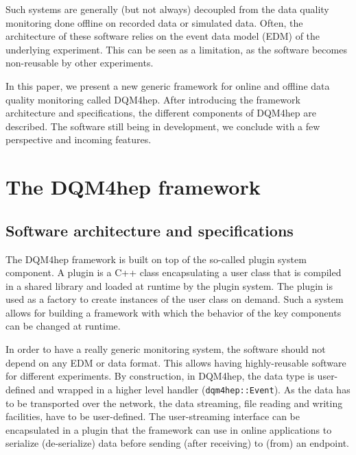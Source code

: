 \documentclass{webofc}
\begin{document}
Such systems are generally (but not always) decoupled from the data quality monitoring done offline on recorded data or simulated data.
Often, the architecture of these software relies on the event data model (EDM) of the underlying experiment. This can be seen as a limitation, as the software becomes non-reusable by other experiments.

In this paper, we present a new generic framework for online and offline data quality monitoring called DQM4hep.
After introducing the framework architecture and specifications, the different components of DQM4hep are described.
The software still being in development, we conclude with a few perspective and incoming features.

\section{The DQM4hep framework}
\label{sec:framework}

\subsection{Software architecture and specifications}
\label{subsec:arch}

The DQM4hep framework is built on top of the so-called plugin system component.
A plugin is a C++ class encapsulating a user class that is compiled in a shared library and loaded at runtime by the plugin system.
The plugin is used as a factory to create instances of the user class on demand.
Such a system allows for building a framework with which the behavior of the key components can be changed at runtime.

In order to have a really generic monitoring system, the software should not depend on any EDM or data format.
This allows having highly-reusable software for different experiments.
By construction, in DQM4hep, the data type is user-defined and wrapped in a higher level handler (\texttt{dqm4hep::Event}).
As the data has to be transported over the network, the data streaming, file reading and writing facilities, have to be user-defined.
The user-streaming interface can be encapsulated in a plugin that the framework can use in online applications to serialize (de-serialize) data before sending (after receiving) to (from) an endpoint.
\end{document}
